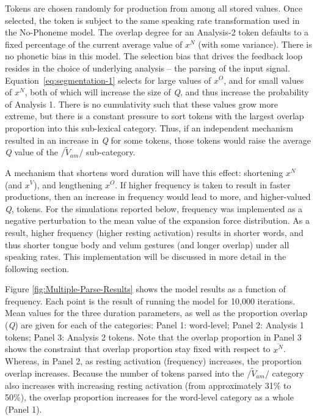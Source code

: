 Tokens are chosen randomly for production from among all stored values.
Once selected, the token is subject to the same speaking rate transformation
used in the No-Phoneme model. The overlap degree for an Analysis-2
token defaults to a fixed percentage of the current average value
of $x^{N}$ (with some variance). There is no phonetic bias in this
model. The selection bias that drives the feedback loop resides in
the choice of underlying analysis – the parsing of the input signal.
Equation~\ref{eq:segmentation-1} selects for large values of $x^{O}$,
and for small values of $x^{N}$, both of which will increase the
size of \emph{Q}, and thus increase the probability of Analysis 1.
There is no cumulativity such that these values grow more extreme,
but there is a constant pressure to sort tokens with the largest overlap
proportion into this sub-lexical category. Thus, if an independent
mechanism resulted in an increase in \emph{Q} for some tokens, those
tokens would raise the average \emph{Q} value of the $/\tilde{V}_{am}/$
sub-category.

A mechanism that shortens word duration will have this effect: shortening
$x^{N}$ (and $x^{V}$), and lengthening $x^{O}$. If higher frequency
is taken to result in faster productions, then an increase in frequency
would lead to more, and higher-valued \emph{Q}, tokens. For the simulations
reported below, frequency was implemented as a negative perturbation
to the mean value of the expansion force distribution. As a result,
higher frequency (higher resting activation) results in shorter words,
and thus shorter tongue body and velum gestures (and longer overlap)
under all speaking rates. This implementation will be discussed in
more detail in the following section. 

Figure \ref{fig:Multiple-Parse-Results} shows the model results as
a function of frequency. Each point is the result of running the model
for 10,000 iterations. Mean values for the three duration parameters,
as well as the proportion overlap (\emph{Q}) are given for each of
the categories: Panel 1: word-level; Panel 2: Analysis 1 tokens; Panel
3: Analysis 2 tokens. Note that the overlap proportion in Panel 3
shows the constraint that overlap proportion stay fixed with respect
to $\overline{x^{N}}$. Whereas, in Panel 2, as resting activation
(frequency) increases, the proportion overlap increases. Because the
number of tokens parsed into the $/\tilde{V}_{am}/$ category also
increases with increasing resting activation (from approximately 31\%
to 50\%), the overlap proportion increases for the word-level category
as a whole (Panel 1). 

